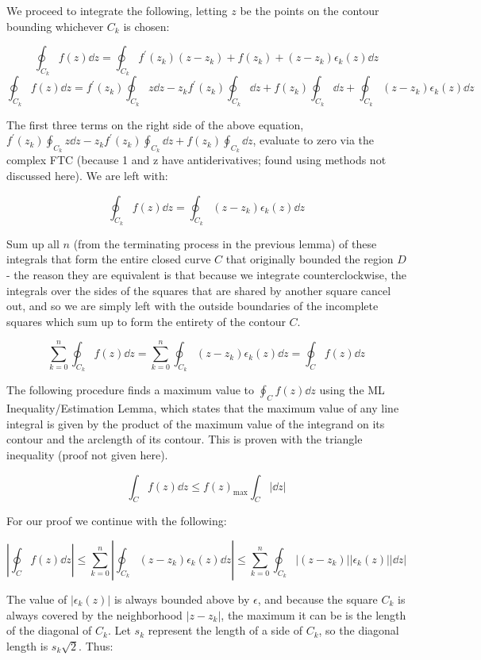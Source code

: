 \documentclass[11pt]{article}
\begin{document}
We proceed to integrate the following, letting $z$ be the points on the contour bounding whichever $C_k$ is chosen:

$$\oint_{C_k} f(z)\dd{z} = \oint_{C_k} f^{\prime}(z_k) (z-z_k) + f(z_k) + (z-z_k)\epsilon_k(z)\dd{z}$$
$$\oint_{C_k} f(z)\dd{z} = f^{\prime}(z_k) \oint_{C_k}z\dd{z} -z_k f^{\prime}(z_k)\oint_{C_k}\dd{z} + f(z_k)\oint_{C_k}\dd{z} + \oint_{C_k}(z-z_k)\epsilon_k(z)\dd{z}$$

The first three terms on the right side of the above equation, $f^{\prime}(z_k) \oint_{C_k}z\dd{z} -z_k f^{\prime}(z_k)\oint_{C_k}\dd{z} + f(z_k)\oint_{C_k}\dd{z}$, evaluate to zero via the complex FTC (because 1 and z have antiderivatives; found using methods not discussed here). We are left with:

$$\oint_{C_k} f(z)\dd{z} = \oint_{C_k}(z-z_k)\epsilon_k(z)\dd{z}$$

Sum up all $n$ (from the terminating process in the previous lemma) of these integrals that form the entire closed curve $C$ that originally bounded the region $D$ - the reason they are equivalent is that because we integrate counterclockwise, the integrals over the sides of the squares that are shared by another square cancel out, and so we are simply left with the outside boundaries of the incomplete squares which sum up to form the entirety of the contour $C$.

$$\sum_{k=0}^n \oint_{C_k} f(z)\dd{z} = \sum_{k=0}^n \oint_{C_k}(z-z_k)\epsilon_k(z)\dd{z} = \oint_{C} f(z)\dd{z}$$

The following procedure finds a maximum value to $\displaystyle{\oint_{C} f(z)\dd{z}}$ using the ML Inequality/Estimation Lemma, which states that the maximum value of any line integral is given by the product of the maximum value of the integrand on its contour and the arclength of its contour. This is proven with the triangle inequality (proof not given here).

$$\int_{C} f(z)\dd{z} \leq f(z)_{\text{max}}\int_C |\dd{z}|$$

For our proof we continue with the following:

$$\left|\oint_{C} f(z)\dd{z}\right| \leq \sum_{k=0}^n \left|\oint_{C_k}(z-z_k)\epsilon_k(z)\dd{z}\right| \leq \sum_{k=0}^n \oint_{C_k}|(z-z_k)||\epsilon_k(z)||\dd{z}|$$

The value of $|\epsilon_k(z)|$ is always bounded above by $\epsilon$, and because the square $C_k$ is always covered by the neighborhood $|z-z_k|$, the maximum it can be is the length of the diagonal of $C_k$. Let $s_k$ represent the length of a side of $C_k$, so the diagonal length is $s_k\sqrt{2}$. Thus:
\end{document}
